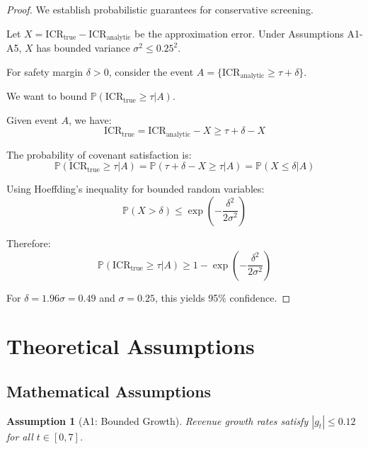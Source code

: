 \documentclass[11pt,a4paper]{article}
\newtheorem{assumption}{Assumption}
\newcommand{\Prob}{\mathbb{P}}
\begin{document}
\begin{proof}
We establish probabilistic guarantees for conservative screening.

Let $X = \text{ICR}_{\text{true}} - \text{ICR}_{\text{analytic}}$ be the approximation error. Under Assumptions A1-A5, $X$ has bounded variance $\sigma^2 \leq 0.25^2$.

For safety margin $\delta > 0$, consider the event $A = \{\text{ICR}_{\text{analytic}} \geq \tau + \delta\}$.

We want to bound $\Prob(\text{ICR}_{\text{true}} \geq \tau | A)$.

Given event $A$, we have:
\begin{equation}
\text{ICR}_{\text{true}} = \text{ICR}_{\text{analytic}} - X \geq \tau + \delta - X
\end{equation}

The probability of covenant satisfaction is:
\begin{equation}
\Prob(\text{ICR}_{\text{true}} \geq \tau | A) = \Prob(\tau + \delta - X \geq \tau | A) = \Prob(X \leq \delta | A)
\end{equation}

Using Hoeffding's inequality for bounded random variables:
\begin{equation}
\Prob(X > \delta) \leq \exp\left(-\frac{\delta^2}{2\sigma^2}\right)
\end{equation}

Therefore:
\begin{equation}
\Prob(\text{ICR}_{\text{true}} \geq \tau | A) \geq 1 - \exp\left(-\frac{\delta^2}{2\sigma^2}\right)
\end{equation}

For $\delta = 1.96\sigma = 0.49$ and $\sigma = 0.25$, this yields 95\% confidence.
\end{proof}

\section{Theoretical Assumptions}
\label{app:assumptions}

\subsection{Mathematical Assumptions}

\begin{assumption}[A1: Bounded Growth]
Revenue growth rates satisfy $|g_t| \leq 0.12$ for all $t \in [0,7]$.
\end{assumption}
\end{document}
